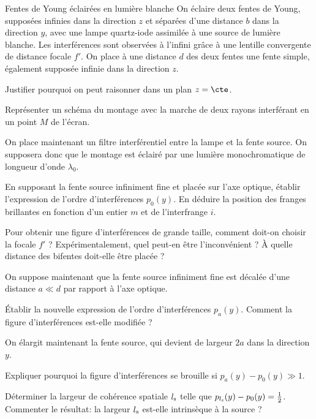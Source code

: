 \begin{exo}[PC]{Fentes de Young éclairées en lumière blanche}
On éclaire deux fentes de Young, supposées infinies dans la direction $z$ et séparées d'une distance $b$ dans la direction $y$, avec une lampe quartz-iode assimilée à une source de lumière blanche. Les interférences sont observées à l'infini grâce à une lentille convergente de distance focale $f'$. On place à une distance $d$ des deux fentes une fente simple, également supposée infinie dans la direction $z$.
\begin{quest}
\item Justifier pourquoi on peut raisonner dans un plan $z=\cte$.
\item Représenter un schéma du montage avec la marche de deux rayons interférant en un point $M$ de l'écran.

On place maintenant un filtre interférentiel entre la lampe et la fente source. On supposera donc que le montage est éclairé par une lumière monochromatique de longueur d'onde $\lambda_0$.

\item En supposant la fente source infiniment fine et placée sur l'axe optique, établir l'expression de l'ordre d'interférences $p_0(y)$. En déduire la position des franges brillantes en fonction d'un entier $m$ et de l'interfrange $i$.
\item Pour obtenir une figure d'interférences de grande taille, comment doit-on choisir la focale $f'$ ? Expérimentalement, quel peut-en être l'inconvénient ? À quelle distance des bifentes doit-elle être placée ?

On suppose maintenant que la fente source infiniment fine est décalée d'une distance $a\ll d$ par rapport à l'axe optique.

\item Établir la nouvelle expression de l'ordre d'interférences $p_a(y)$. Comment la figure d'interférences est-elle modifiée ?

On élargit maintenant la fente source, qui devient de largeur $2a$ dans la direction $y$.

\item Expliquer pourquoi la figure d'interférences se brouille si $p_a(y)-p_0(y)\gg 1$.

\item Déterminer la largeur de cohérence spatiale $l_{\rm{s}}$ telle que $p_{l_{\rm{s}}}(y)-p_0(y)=\frac{1}{2}$. Commenter le résultat: la largeur $l_{\rm{s}}$ est-elle intrinsèque à la source ?


\end{quest}
\end{exo}
